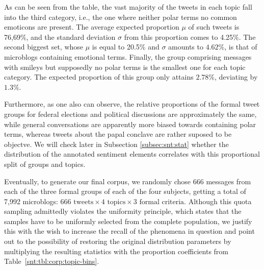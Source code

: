 As can be seen from the table, the vast majority of the tweets in each
topic fall into the third category, i.e., the one where neither polar
terms no common emoticons are present.  The average expected
proportion $\mu$ of such tweets is 76,69\%, and the standard deviation
$\sigma$ from this proportion comes to 4.25\%.  The second biggest
set, whose $\mu$ is equal to 20.5\% and $\sigma$ amounts to $4.62\%$,
is that of microblogs containing emotional terms.  Finally, the group
comprising messages with smileys but supposedly no polar terms is the
smallest one for each topic category.  The expected proportion of this
group only attains $2.78\%$, deviating by $1.3\%$.

Furthermore, as one also can observe, the relative proportions of the
formal tweet groups for federal elections and political discussions
are approximately the same, while general conversations are apparently
more biased towards containing polar terms, whereas tweets about the
papal conclave are rather suposed to be objectve.  We will check later
in Subsection \ref{subsec:snt:stat} whether the distribution of the
annotated sentiment elements correlates with this proportional split
of groups and topics.

Eventually, to generate our final corpus, we randomly chose 666
messages from each of the three formal groups of each of the four
subjects, getting a total of 7,992 microblogs: $666\text{ tweets}
\times 4\text{ topics} \times 3\text{ formal criteria}$.  Although
this quota sampling admittedly violates the uniformity principle,
which states that the samples have to be uniformly selected from the
complete population, we justify this with the wish to increase the
recall of the phenomena in question and point out to the possibility
of restoring the original distribution parameters by multiplying the
resulting statistics with the proportion coefficients from
Table~\ref{snt:tbl:corp:topic-bins}.

